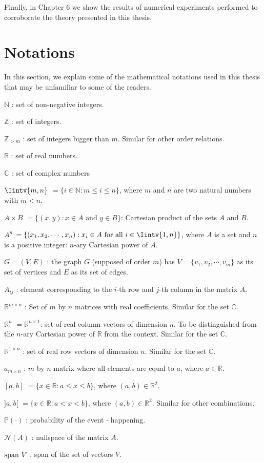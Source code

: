 Finally, in Chapter 6 we show the results of numerical experiments performed to corroborate the theory presented in this thesis.

\section{Notations}
In this section, we explain some of the mathematical notations used in this thesis that may be unfamiliar to some of the readers.


\begin{abbrv}
\item[$\mathbb N$]: set of non-negative integers.
\item[$\mathbb Z$]: set of integers.
\item[$ \mathbb Z_{>m}$]: set of integers bigger than $m$. Similar for other order relations.
\item[$\mathbb R$]: set of real numbers.
\item[$\mathbb C$]: set of complex numbers 
\item[$\Iintv{m,n}$] $= \{ i \in \mathbb N: m \le i \le n \}$, where $m$ and $n$ are two natural numbers with $m < n$.
\item[$A \times B$] $= \{ (x,y): x \in A \text{ and } y \in B \}$:  Cartesian product of the sets $A$ and $B$.
\item[$A^n$]  $= \{ (x_1, x_2, \cdots, x_n): x_i \in A \text{ for all } i \in \Iintv{1,n} \}$, where $A$ is a set and $n$ is a positive integer: $n$-ary Cartesian power of $A$.
\item[$G = (V,E)$] : the graph $G$ (supposed of order $m$) has $V = \{ v_1, v_2, \cdots, v_m \}$ as its set of vertices and $E$ as its set of edges.
\item[$A_{ij}$] : element corresponding to the $i$-th row and $j$-th column in the matrix $A$.
\item[$\mathbb R ^{m \times n}$] : Set of $m$ by $n$ matrices with real coefficients. Similar for the set $\mathbb C$.
\item[$\mathbb R^n$] $= \mathbb R^{n \times 1}$: set of real column vectors of dimension $n$. To be distinguished from the $n$-ary Cartesian power of $\mathbb R$ from the context. Similar for the set $\mathbb C$.
\item[$\mathbb R^{1 \times n}$]: set of real row vectors of dimension $n$. Similar for the set $\mathbb C$.
\item[$a_{m \times n}$]: $m$ by $n$ matrix where all elements are equal to $a$, where $a \in \mathbb R$.
\item[$ { [a , b]  }  $]  $= \{ x \in \mathbb R: a \le x \le b \} $, where $(a,b) \in \mathbb R^2$.
\item[ ${ ] a , b [ }$ ] $= \{ x \in \mathbb R: a < x < b \}$, where $(a,b) \in \mathbb R^2$. Similar for other combinations.
\item[ $\mathbb P ( \cdot )$]: probability of the event $\cdot$ happening.
\item[$\mathcal N (A)$]: nullspace of the matrix $A$.
\item[$\operatorname{span\,} V$]: span of the set of vectors $V$.
\end{abbrv}

